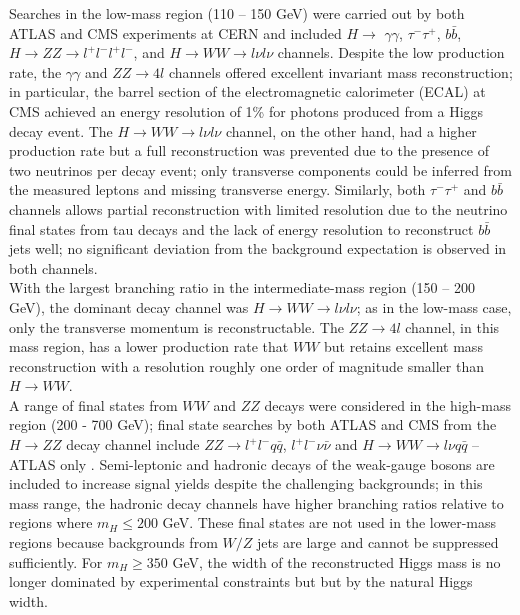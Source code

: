 \documentclass[a4paper,11pt]{article}
\begin{document}
Searches in the low-mass region (110 -- 150 GeV) were carried out by both ATLAS and CMS experiments at CERN and included $H \rightarrow$ $\gamma \gamma$, $\tau^- \tau^+$, $b\bar{b}$, $H \rightarrow ZZ \rightarrow l^+l^-l^+l^-$, and $H \rightarrow WW \rightarrow l \nu l \nu$ channels. Despite the low production rate, the $\gamma \gamma$ and $ZZ\rightarrow 4l$ channels offered excellent invariant mass reconstruction; in particular, the barrel section of the electromagnetic calorimeter (ECAL) at CMS achieved an energy resolution of 1\% for photons produced from a Higgs decay event\cite{CMS:2015myp}. The $H\rightarrow WW \rightarrow l\nu l \nu$ channel, on the other hand, had a higher production rate but a full reconstruction was prevented due to the presence of two neutrinos per decay event; only transverse components could be inferred from the measured leptons and missing transverse energy. Similarly, both $\tau^- \tau^+$ and $b\bar{b}$ channels allows partial reconstruction with limited resolution due to the neutrino final states from tau decays and the lack of energy resolution to reconstruct $b\bar{b}$ jets well; no
significant deviation from the background expectation is observed in both channels.\\

With the largest branching ratio in the intermediate-mass region (150 -- 200 GeV), the dominant decay channel was $H\rightarrow WW \rightarrow l \nu l\nu$; as in the low-mass case, only the transverse momentum is reconstructable. The $ZZ \rightarrow 4l$ channel, in this mass region, has a lower production rate that $WW$ but retains excellent mass reconstruction with a resolution roughly one order of magnitude smaller than $H \rightarrow WW$.\\

A range of final states from $WW$ and $ZZ$ decays were considered in the high-mass region (200 - 700 GeV); final state searches by both ATLAS and CMS from the $H \rightarrow ZZ$ decay channel include $ZZ \rightarrow l^+l^-q\bar{q}$, $l^+l^-\nu \bar{\nu}$ and $H \rightarrow WW \rightarrow l\nu q \bar{q}$ --ATLAS only . Semi-leptonic and hadronic decays of the weak-gauge bosons are included to increase signal yields despite the challenging backgrounds; in this mass range, the hadronic decay channels have higher branching ratios relative to regions where $m_H \leq 200$ GeV. These final states are not used in the lower-mass regions because backgrounds from $W/Z$ jets are large and cannot be suppressed sufficiently. For $m_H\geq 350$ GeV, the width of the reconstructed Higgs mass is no longer dominated by experimental constraints but but by the natural Higgs width.
\end{document}
